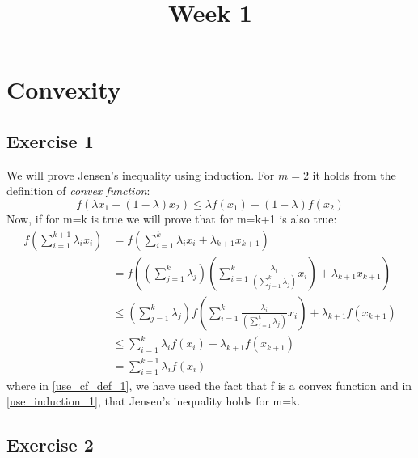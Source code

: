 \documentclass[twoside,11pt]{article}
\begin{document}
	
\title{Week 1}
\date{\vspace{-5ex}}
\maketitle

\section{Convexity}

\subsection{Exercise 1}

We will prove Jensen's inequality using induction.
For $m=2$ it holds from the definition of \emph{convex function}:
\begin{equation}
f(\lambda x_1 + (1 - \lambda) x_2) \leq \lambda f(x_1) + (1 - \lambda) f(x_2)
\end{equation}
Now, if for m=k is true we will prove that for m=k+1 is also true:
\begin{align}
	f\left(\sum_{i=1}^{k+1} \lambda_{i} x_{i}\right) & = f\left(\sum_{i=1}^{k} \lambda_{i} x_{i} + \lambda_{k+1}x_{k+1}\right) \\
	& = f\left(\left(\sum_{j=1}^{k} \lambda_j \right) \left(\sum_{i=1}^{k} \frac{\lambda_{i}}{\left(\sum_{j=1}^{k} \lambda_j \right)} x_{i} \right) + \lambda_{k+1}x_{k+1}\right) \\
	& \leq \left(\sum_{j=1}^{k} \lambda_j \right) f\left(\sum_{i=1}^{k} \frac{\lambda_{i}}{\left(\sum_{j=1}^{k} \lambda_j \right)} x_{i} \right) + \lambda_{k+1}f(x_{k+1}) \\ \label{use_cf_def_1}
	& \leq \sum_{i=1}^{k} \lambda_{i} f(x_{i}) + \lambda_{k+1}f(x_{k+1}) \\ \label{use_induction_1}
	& = \sum_{i=1}^{k+1} \lambda_{i} f(x_{i})
\end{align}
where in \eqref{use_cf_def_1}, we have used the fact that f is a convex function and in \eqref{use_induction_1}, that Jensen's inequality holds for m=k.

\subsection{Exercise 2}


	
\end{document}
